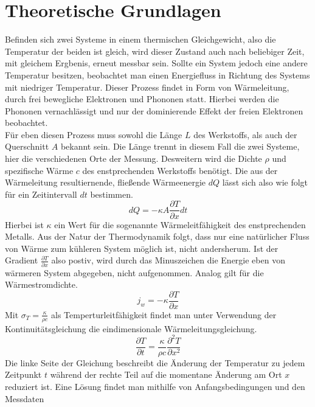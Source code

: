 \section{Theoretische Grundlagen}
Befinden sich zwei Systeme in einem thermischen Gleichgewicht, also die Temperatur der beiden ist gleich, 
wird dieser Zustand auch nach beliebiger Zeit, mit gleichem Ergbenis, erneut messbar sein. Sollte ein System jedoch eine andere Temperatur besitzen, beobachtet 
man einen Energiefluss in Richtung des Systems mit niedriger Temperatur. Dieser Prozess findet in Form von Wärmeleitung, durch frei bewegliche Elektronen und Phononen statt.
Hierbei werden die Phononen vernachlässigt und nur der dominierende Effekt der freien Elektronen beobachtet.
\\
\newline
Für eben diesen Prozess muss sowohl die Länge $L$ des Werkstoffs, als auch der Querschnitt $A$ bekannt sein. Die Länge trennt in diesem Fall die zwei Systeme,
hier die verschiedenen Orte der Messung. Desweitern wird die Dichte $\rho$ und spezifische Wärme $c$ des enstprechenden Werkstoffs benötigt.
Die aus der Wärmeleitung resultiernende, fließende Wärmeenergie $dQ$ lässt sich also wie folgt für ein Zeitintervall $dt$ bestimmen.
\begin{equation}
    \label{eqn:itsHeadacheTimeYeeeay}
    dQ = -\kappa A \frac{\partial T}{\partial x} dt 
\end{equation}
Hierbei ist $\kappa$ ein Wert für die sogenannte Wärmeleitfähigkeit des enstprechenden Metalls. Aus der Natur der Thermodynamik 
folgt, dass nur eine natürlicher Fluss von Wärme zum kühleren System möglich ist, nicht andersherum. Ist der Gradient $\frac{\partial T}{\partial x}$ also postiv, 
wird durch das Minuszeichen die Energie eben von wärmeren System abgegeben, nicht aufgenommen.
Analog gilt für die Wärmestromdichte.
\begin{equation}
    \label{eqn:stromdichte}
    j_w = -\kappa \frac{\partial T}{\partial x}
\end{equation}
Mit $ \sigma_T = \frac{\kappa}{\rho c}$ als Temperturleitfähigkeit findet man unter Verwendung der Kontinuitätsgleichung die eindimensionale Wärmeleitungsgleichung.
\begin{equation}
    \label{eqn:1dim}
    \frac{\partial T}{\partial t} = \frac{\kappa}{\rho c} \frac{\partial^2 T}{\partial x^2}
\end{equation}
Die linke Seite der Gleichung beschreibt die Änderung der Temperatur zu jedem Zeitpunkt $t$ während der rechte Teil 
auf die momentane Änderung am Ort $x$ reduziert ist. Eine Lösung findet man mithilfe von Anfangsbedingungen und den Messdaten 
